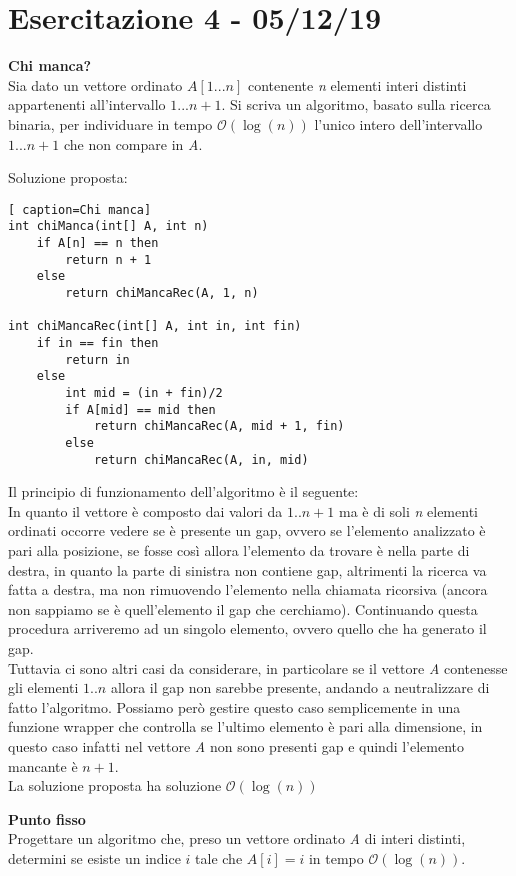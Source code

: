 \documentclass[../cheatSheetAlgoritmi.tex]{subfiles}
\begin{document}
\section{Esercitazione 4 - 05/12/19}
\textbf{Chi manca?} \\
Sia dato un vettore ordinato $A[1...n]$ contenente \textit{n} elementi interi distinti appartenenti all’intervallo $1...n+1$. Si scriva un algoritmo, basato sulla ricerca binaria, per individuare in tempo $\mathcal{O}(\log(n))$ l’unico intero dell’intervallo $1...n+1$ che non compare in \textit{A}.

\bigskip
Soluzione proposta:
\begin{lstlisting}[ caption=Chi manca]
int chiManca(int[] A, int n)
	if A[n] == n then
		return n + 1
	else	
		return chiMancaRec(A, 1, n)

int chiMancaRec(int[] A, int in, int fin)
	if in == fin then 
  		return in
  	else
    	int mid = (in + fin)/2
    	if A[mid] == mid then 
      		return chiMancaRec(A, mid + 1, fin)
    	else
      		return chiMancaRec(A, in, mid)
\end{lstlisting}
Il principio di funzionamento dell'algoritmo è il seguente: \\
In quanto il vettore è composto dai valori da $1..n+1$ ma è di soli \textit{n} elementi ordinati occorre vedere se è presente un gap, ovvero se l'elemento analizzato è pari alla posizione, se fosse così allora l'elemento da trovare è nella parte di destra, in quanto la parte di sinistra non contiene gap, altrimenti la ricerca va fatta a destra, ma non rimuovendo l'elemento nella chiamata ricorsiva (ancora non sappiamo se è quell'elemento il gap che cerchiamo). Continuando questa procedura arriveremo ad un singolo elemento, ovvero quello che ha generato il gap.\\
Tuttavia ci sono altri casi da considerare, in particolare se il vettore \textit{A} contenesse gli elementi $1..n$ allora il gap non sarebbe presente, andando a neutralizzare di fatto l'algoritmo. Possiamo però gestire questo caso semplicemente in una funzione wrapper che controlla se l'ultimo elemento è pari alla dimensione, in questo caso infatti nel vettore \textit{A} non sono presenti gap e quindi l'elemento mancante è $n + 1$. \\
La soluzione proposta ha soluzione $\mathcal{O}(\log(n))$

\bigskip
\textbf{Punto fisso} \\
Progettare un algoritmo che, preso un vettore ordinato \textit{A} di interi distinti, determini se esiste un indice $i$ tale che $A[i] = i$ in tempo $\mathcal{O}(\log(n))$.
\end{document}
